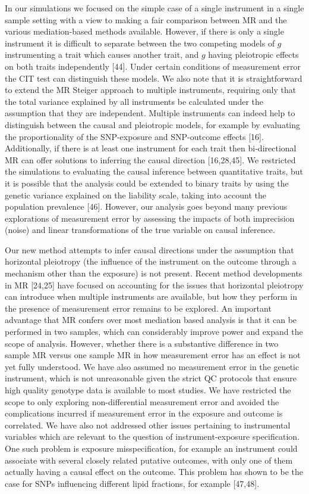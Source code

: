 \documentclass[]{article}
\begin{document}
In our simulations we focused on the simple case of a single instrument
in a single sample setting with a view to making a fair comparison
between MR and the various mediation-based methods available. However,
if there is only a single instrument it is difficult to separate between
the two competing models of \(g\) instrumenting a trait which causes
another trait, and \(g\) having pleiotropic effects on both traits
independently {[}44{]}. Under certain conditions of measurement error
the CIT test can distinguish these models. We also note that it is
straightforward to extend the MR Steiger approach to multiple
instruments, requiring only that the total variance explained by all
instruments be calculated under the assumption that they are
independent. Multiple instruments can indeed help to distinguish between
the causal and pleiotropic models, for example by evaluating the
proportionality of the SNP-exposure and SNP-outcome effects {[}16{]}.
Additionally, if there is at least one instrument for each trait then
bi-directional MR can offer solutions to inferring the causal direction
{[}16,28,45{]}. We restricted the simulations to evaluating the causal
inference between quantitative traits, but it is possible that the
analysis could be extended to binary traits by using the genetic
variance explained on the liability scale, taking into account the
population prevalence {[}46{]}. However, our analysis goes beyond many
previous explorations of measurement error by assessing the impacts of
both imprecision (noise) and linear transformations of the true variable
on causal inference.

Our new method attempts to infer causal directions under the assumption
that horizontal pleiotropy (the influence of the instrument on the
outcome through a mechanism other than the exposure) is not present.
Recent method developments in MR {[}24,25{]} have focused on accounting
for the issues that horizontal pleiotropy can introduce when multiple
instruments are available, but how they perform in the presence of
measurement error remains to be explored. An important advantage that MR
confers over most mediation based analysis is that it can be performed
in two samples, which can considerably improve power and expand the
scope of analysis. However, whether there is a substantive difference in
two sample MR versus one sample MR in how measurement error has an
effect is not yet fully understood. We have also assumed no measurement
error in the genetic instrument, which is not unreasonable given the
strict QC protocols that ensure high quality genotype data is available
to most studies. We have restricted the scope to only exploring
non-differential measurement error and avoided the complications
incurred if measurement error in the exposure and outcome is correlated.
We have also not addressed other issues pertaining to instrumental
variables which are relevant to the question of instrument-exposure
specification. One such problem is exposure misspecification, for
example an instrument could associate with several closely related
putative outcomes, with only one of them actually having a causal effect
on the outcome. This problem has shown to be the case for SNPs
influencing different lipid fractions, for example {[}47,48{]}.
\end{document}
